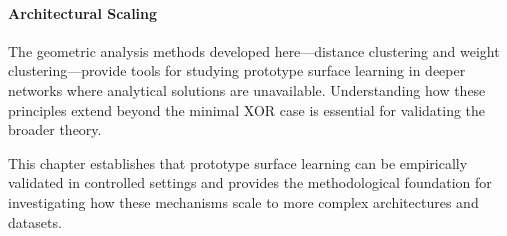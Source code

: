 \paragraph{Architectural Scaling}
The geometric analysis methods developed here—distance clustering and weight clustering—provide tools for studying prototype surface learning in deeper networks where analytical solutions are unavailable. Understanding how these principles extend beyond the minimal XOR case is essential for validating the broader theory.

This chapter establishes that prototype surface learning can be empirically validated in controlled settings and provides the methodological foundation for investigating how these mechanisms scale to more complex architectures and datasets.
